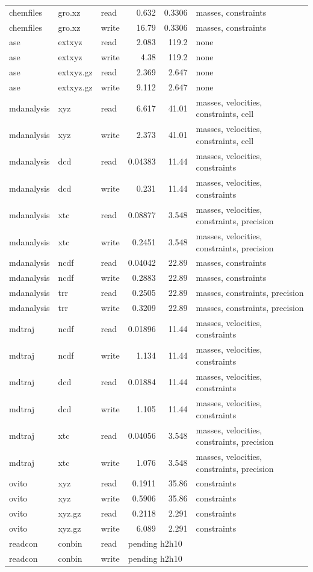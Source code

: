 {\begin{longtable}{@{}lllrr p{}@{}}
chemfiles & gro.xz & read & 0.632 & 0.3306 & masses, constraints \\
chemfiles & gro.xz & write & 16.79 & 0.3306 & masses, constraints \\
ase & extxyz & read & 2.083 & 119.2 & none \\
ase & extxyz & write & 4.38 & 119.2 & none \\
ase & extxyz.gz & read & 2.369 & 2.647 & none \\
ase & extxyz.gz & write & 9.112 & 2.647 & none \\
mdanalysis & xyz & read & 6.617 & 41.01 & masses, velocities, constraints, cell \\
mdanalysis & xyz & write & 2.373 & 41.01 & masses, velocities, constraints, cell \\
mdanalysis & dcd & read & 0.04383 & 11.44 & masses, velocities, constraints \\
mdanalysis & dcd & write & 0.231 & 11.44 & masses, velocities, constraints \\
mdanalysis & xtc & read & 0.08877 & 3.548 & masses, velocities, constraints, precision \\
mdanalysis & xtc & write & 0.2451 & 3.548 & masses, velocities, constraints, precision \\
mdanalysis & ncdf & read & 0.04042 & 22.89 & masses, constraints \\
mdanalysis & ncdf & write & 0.2883 & 22.89 & masses, constraints \\
mdanalysis & trr & read & 0.2505 & 22.89 & masses, constraints, precision \\
mdanalysis & trr & write & 0.3209 & 22.89 & masses, constraints, precision \\
mdtraj & ncdf & read & 0.01896 & 11.44 & masses, velocities, constraints \\
mdtraj & ncdf & write & 1.134 & 11.44 & masses, velocities, constraints \\
mdtraj & dcd & read & 0.01884 & 11.44 & masses, velocities, constraints \\
mdtraj & dcd & write & 1.105 & 11.44 & masses, velocities, constraints \\
mdtraj & xtc & read & 0.04056 & 3.548 & masses, velocities, constraints, precision \\
mdtraj & xtc & write & 1.076 & 3.548 & masses, velocities, constraints, precision \\
ovito & xyz & read & 0.1911 & 35.86 & constraints \\
ovito & xyz & write & 0.5906 & 35.86 & constraints \\
ovito & xyz.gz & read & 0.2118 & 2.291 & constraints \\
ovito & xyz.gz & write & 6.089 & 2.291 & constraints \\
readcon & conbin & read & \multicolumn{3}{l}{pending h2h10} \\
readcon & conbin & write & \multicolumn{3}{l}{pending h2h10} \\
\bottomrule
\end{longtable}
}
